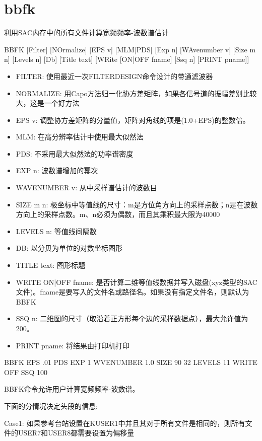 \section{bbfk}
\label{cmd:bbfk}

利用SAC内存中的所有文件计算宽频频率-波数谱估计

 BBFK [Filter] [NOrmalize] [EPS v] [MLM|PDS] [Exp n] [WAvenumber v] [Size m n] [Levels n] [Db] [Title text] [WRite [ON|OFF fname] [Ssq n] [PRINT pname]]

\begin{itemize}
\item FILTER: 使用最近一次FILTERDESIGN命令设计的带通滤波器
\item NORMALIZE: 用Capo方法归一化协方差矩阵，如果各信号道的振幅差别比较大，这是一个好方法
\item EPS v: 调整协方差矩阵的分量值，矩阵对角线的项是(1.0+EPS)的整数倍。
\item MLM: 在高分辨率估计中使用最大似然法
\item PDS: 不采用最大似然法的功率谱密度
\item EXP n: 波数谱增加的幂次
\item WAVENUMBER v: 从中采样谱估计的波数目
\item SIZE m n: 极坐标中等值线的尺寸：m是方位角方向上的采样点数；n是在波数方向上的采样点数。m、n必须为偶数，而且其乘积最大限为40000 
\item LEVELS n: 等值线间隔数
\item DB: 以分贝为单位的对数坐标图形
\item TITLE text: 图形标题
\item WRITE ON|OFF fname: 是否计算二维等值线数据并写入磁盘(xyz类型的SAC文件)。fname是要写入的文件名或路径名。如果没有指定文件名，则默认为BBFK
\item SSQ n: 二维图的尺寸（取沿着正方形每个边的采样数据点），最大允许值为200。
\item PRINT pname: 将结果由打印机打印
\end{itemize}

BBFK EPS .01 PDS EXP 1 WVENUMBER 1.0 SIZE 90 32 LEVELS 11 WRITE OFF SSQ 100

BBFK命令允许用户计算宽频频率-波数谱。

下面的分情况决定头段的信息:

Case1: 如果参考台站设置在KUSER1中并且其对于所有文件是相同的，则所有文件的USER7和USER8都需要设置为偏移量

